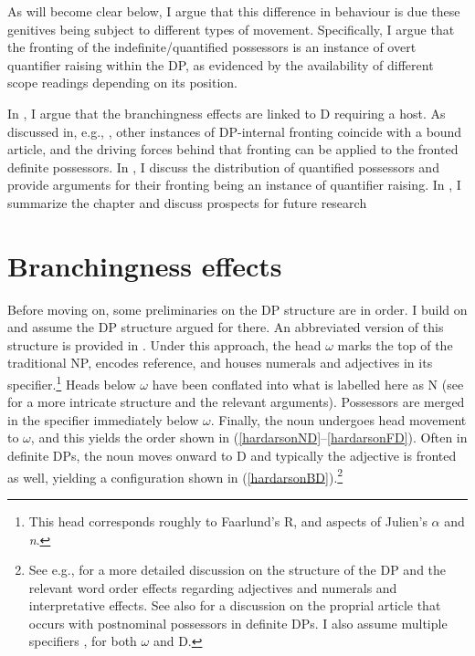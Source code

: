 \documentclass[output=paper,colorlinks,citecolor=brown,
]{langscibook}
\begin{document}
As will become clear below, I argue that this difference in behaviour is due these genitives being subject to different types of movement. Specifically, I argue that the fronting of the indefinite/quantified possessors is an instance of overt quantifier raising within the DP, as evidenced by the availability of different scope readings depending on its position.

In , I argue that the branchingness effects are linked to D requiring a host. As discussed in, e.g., \citet{Hardarson:2016wd}, other instances of DP-internal fronting coincide with a bound article, and the driving forces behind that fronting can be applied to the fronted definite possessors. In , I discuss the distribution of quantified possessors and provide arguments for their fronting being an instance of quantifier raising. In , I summarize the chapter and discuss prospects for future research

\section{Branchingness effects}
\label{hardarsonsec:branches}

Before moving on, some preliminaries on the DP structure are in order. I build on \citet{Hardarson:2016wd} and assume the DP structure argued for there. An abbreviated version of this structure is provided in . Under this approach, the head $\omega$ marks the top of the traditional NP, encodes reference, and houses numerals and adjectives in its specifier.\footnote{This head corresponds roughly to Faarlund's \citeyearpar{Faarlund:2004,Faarlund:2009tq} R, and aspects of Julien's \citeyearpar{Julien:2003wu,Julien:2005wh} $\alpha$ and \textit{n}.} Heads below $\omega$ have been conflated into what is labelled here as N (see \citealt{Hardarson:2016wd} for a more intricate structure and the relevant arguments). Possessors are merged in the specifier immediately below $\omega$. Finally, the noun undergoes head movement to $\omega$, and this yields the order shown in (\ref{hardarsonND}--\ref{hardarsonFD}). Often in definite DPs, the noun moves onward to D and typically the adjective is fronted as well, yielding a configuration shown in (\ref{hardarsonBD}).\footnote{See e.g., \citep{Magnusson:1984ue,HAS:1993,Sigurdsson:2006wn,Pfaff:2015tp,Ingason:2016wv,Hardarson:2016wd} for a more detailed discussion on the structure of the DP and the relevant word order effects regarding adjectives and numerals and interpretative effects. See also \citet{Sigurdsson:2006wn} for a discussion on the proprial article that occurs with postnominal possessors in definite DPs. I also assume multiple specifiers \citep[e.g.,][]{Chomsky:1995uq,Lahne:2009va}, for both $\omega$ and D.}
\end{document}
